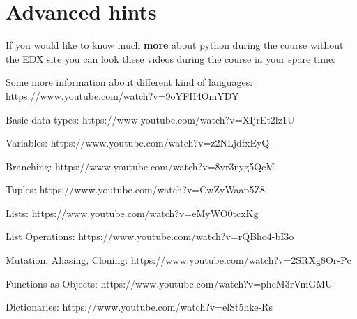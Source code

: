 \documentclass[11pt]{article}
\begin{document}
\section{Advanced hints}\label{advanced-hints}

If you would like to know much \textbf{more} about python during the
course without the EDX site you can look these videos during the course
in your spare time:

Some more information about different kind of languages:
https://www.youtube.com/watch?v=9oYFH4OmYDY

Basic data types: https://www.youtube.com/watch?v=XIjrEt2lz1U

Variables: https://www.youtube.com/watch?v=z2NLjdfxEyQ

Branching: https://www.youtube.com/watch?v=8vr3nyg5QcM

Tuples: https://www.youtube.com/watch?v=CwZyWaap5Z8

Lists: https://www.youtube.com/watch?v=eMyWO0tcxKg

List Operations: https://www.youtube.com/watch?v=rQBho4-bI3o

Mutation, Aliasing, Cloning: https://www.youtube.com/watch?v=2SRXg8Or-Pc

Functions as Objects: https://www.youtube.com/watch?v=pheM3rVmGMU

Dictionaries: https://www.youtube.com/watch?v=elSt5hke-Rs


    

    
\end{document}
